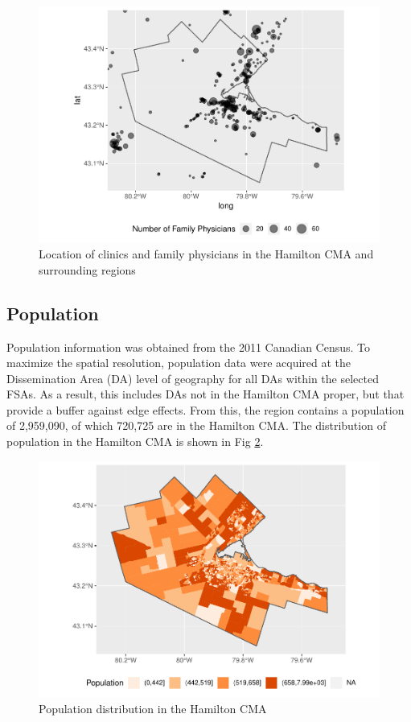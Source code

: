 \documentclass[10pt,letterpaper]{article}
\begin{document}
\begin{figure}
\includegraphics[width=0.95\linewidth]{Supply_and_Demand_Inflation_in_FCA_Methods_v2.1_files/figure-latex/fig10-clinic-map-1} \caption{\label{fig:fig10-clinic-map}Location of clinics and family physicians in the Hamilton CMA and surrounding regions}\label{fig:fig10-clinic-map}
\end{figure}

\subsection{Population}\label{population}

Population information was obtained from the 2011 Canadian Census. To
maximize the spatial resolution, population data were acquired at the
Dissemination Area (DA) level of geography for all DAs within the
selected FSAs. As a result, this includes DAs not in the Hamilton CMA
proper, but that provide a buffer against edge effects. From this, the
region contains a population of 2,959,090, of which 720,725 are in the
Hamilton CMA. The distribution of population in the Hamilton CMA is
shown in Fig \ref{fig:fig11-population-map}.

\begin{figure}
\includegraphics[width=0.95\linewidth]{Supply_and_Demand_Inflation_in_FCA_Methods_v2.1_files/figure-latex/fig11-population-map-1} \caption{\label{fig:fig11-population-map}Population distribution in the Hamilton CMA}\label{fig:fig11-population-map}
\end{figure}
\end{document}
